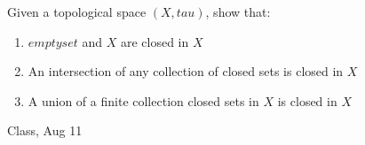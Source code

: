 \begin{samepage}
\begin{ex}
 Given a topological space $(X, tau)$, show that:
    \begin{enumerate}
        \item $empty set$ and $X$ are closed in $X$
        \item An intersection of any collection of closed sets is closed in $X$
        \item A union of a finite collection closed sets in $X$ is closed in $X$
    \end{enumerate}
\end{ex}
\begin{source}
Class, Aug 11
\end{source}
\end{samepage}
